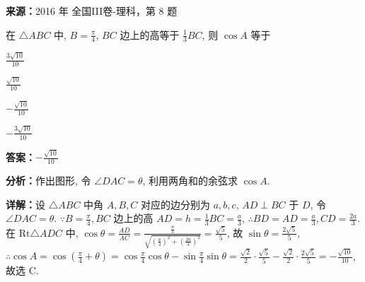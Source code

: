 \begin{question}[points=5]
\textbf{来源：}2016 年 全国III卷-理科，第 8 题\par
在 $\triangle ABC$ 中, $B=\frac{\pi}{4}$, $BC$ 边上的高等于 $\frac{1}{3}BC$, 则 $\cos A$ 等于
\begin{choices}
  \item $\frac{3\sqrt{10}}{10}$
  \item $\frac{\sqrt{10}}{10}$
  \item $-\frac{\sqrt{10}}{10}$
  \item $-\frac{3\sqrt{10}}{10}$
\end{choices}
\begin{solution}
\textbf{答案：}$-\frac{\sqrt{10}}{10}$

\textbf{分析：}作出图形, 令 $\angle DAC=\theta$, 利用两角和的余弦求 $\cos A$.

\textbf{详解：}设 $\triangle ABC$ 中角 $A,B,C$ 对应的边分别为 $a,b,c$, $AD\perp BC$ 于 $D$, 令 $\angle DAC=\theta$. $\because B=\frac{\pi}{4}, BC$ 边上的高 $AD=h=\frac{1}{3}BC=\frac{a}{3}$, $\therefore BD=AD=\frac{a}{3}, CD=\frac{2a}{3}$. 在 $\mathrm{Rt}\triangle ADC$ 中, $\cos\theta=\frac{AD}{AC}=\frac{\frac{a}{3}}{\sqrt{(\frac{a}{3})^2+(\frac{2a}{3})^2}}=\frac{\sqrt{5}}{5}$, 故 $\sin\theta=\frac{2\sqrt{5}}{5}$, $\therefore \cos A=\cos(\frac{\pi}{4}+\theta)=\cos\frac{\pi}{4}\cos\theta-\sin\frac{\pi}{4}\sin\theta=\frac{\sqrt{2}}{2}\cdot\frac{\sqrt{5}}{5}-\frac{\sqrt{2}}{2}\cdot\frac{2\sqrt{5}}{5}=-\frac{\sqrt{10}}{10}$, 故选 C.
\end{solution}
\end{question}

